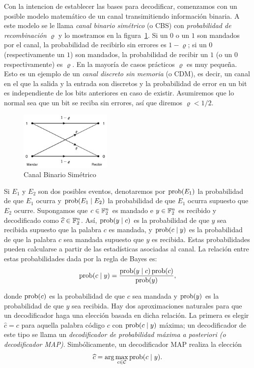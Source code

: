 Con la intencion de establecer las bases para decodificar, comenzamos con un posible modelo matemático de un canal transimitiendo información binaria. A este modelo se le llama \textit{canal binario simétrico} (o CBS) con \textit{probabilidad de recombinación} \(\varrho\) y lo mostramos en la figura~\ref{fig:binary_sym_channel}. Si un \(0\) o un \(1\) son mandados por el canal, la probabilidad de recibirlo sin errores es \(1 - \varrho\); si un \(0\) (respectivamente un \(1\)) son mandados, la probabilidad de recibir un \(1\) (o un \(0\) respectivamente) es \(\varrho\). En la mayoría de casos prácticos \(\varrho\) es muy pequeña. Esto es un ejemplo de un \textit{canal discreto sin memoria} (o CDM), es decir, un canal en el que la salida y la entrada son discretos y la probabilidad de error en un bit es independiente de los bits anteriores en caso de existir. Asumiremos que lo normal sea que un bit se reciba sin errores, así que diremos \(\varrho < 1/2\).

\begin{figure}[h]
    \centering
    \includegraphics[width=0.4\textwidth]{diagram.pdf}
    \caption{Canal Binario Simétrico}
    \label{fig:binary_sym_channel}
\end{figure}

Si \(E_1\) y \(E_2\) son dos posibles eventos, denotaremos por \(\operatorname{prob} (E_1)\) la probabilidad de que \(E_1\) ocurra y \(\operatorname{prob} (E_1 \mid E_2)\) la probabilidad de que \(E_1\) ocurra supuesto que \(E_2\) ocurre. Supongamos que \(c \in \mathbb{F}_2^{n}\) es mandado e \(y \in \mathbb{F}_2^{n}\) es recibido y decodificado como \(\widehat{c} \in \mathbb{F}_2^{n}\). Así, \(\operatorname{prob} (y  \mid c)\) es la probabilidad de que \(y\) sea recibida supuesto que la palabra \(c\) es mandada, y \(\operatorname{prob} (c  \mid y)\) es la probabilidad de que la palabra \(c\) sea mandada supuesto que \(y\) es recibida. Estas probabilidades pueden calcularse a partir de las estadísticas asociadas al canal. La relación entre estas probabilidades dada por la regla de Bayes es:
\[
\operatorname{prob}(c  \mid y) = \frac{\operatorname{prob}(y \mid c)\operatorname{prob}(c)}{\operatorname{prob}(y)}
,\]

donde \(\operatorname{prob}(c)\) es la probabilidad de que \(c\) sea mandada y \(\operatorname{prob}(y)\) es la probabilidad de que \(y\) sea recibida. Hay dos aproximaciones naturales para que un decodificador haga una elección basada en dicha relación. La primera es elegir \(\widehat{c} = c\) para aquella palabra código \(c\) con \(\operatorname{prob}(c \mid y)\) máxima; un decodificador de este tipo se llama un \textit{decodificador de probabilidad máxima a posteriori (o decodificador MAP)}. Simbólicamente, un decodificador MAP realiza la elección
\[
\widehat{c} = \arg \max_{c \in \mathcal{C}} \operatorname{prob}(c \mid y)
.\]

